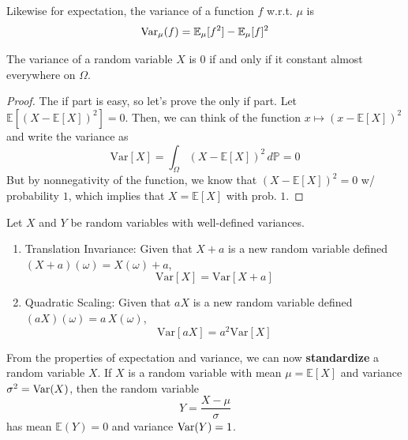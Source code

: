   Likewise for expectation, the variance of a function $f$ w.r.t. $\mu$ is 
  \begin{equation}
    \Var_\mu (f) = \mathbb{E}_\mu [f^2] - \mathbb{E}_\mu [f]^2
  \end{equation}

  \begin{proposition}
    The variance of a random variable $X$ is $0$ if and only if it constant almost everywhere on $\Omega$. 
  \end{proposition}
  \begin{proof}
    The if part is easy, so let's prove the only if part. Let $\mathbb{E} [ (X - \mathbb{E}[X])^2 ] = 0$. Then, we can think of the function $x \mapsto (x - \mathbb{E}[X])^2$ and write the variance as 
    \begin{equation}
      \mathrm{Var}[X] = \int_\Omega (X - \mathbb{E}[X])^2 \, d\mathbb{P} = 0
    \end{equation}
    But by nonnegativity of the function, we know that $(X - \mathbb{E}[X])^2 = 0$ w/ probability $1$, which implies that $X = \mathbb{E}[X]$ with prob. $1$. 
  \end{proof}

  \begin{lemma}
    Let $X$ and $Y$ be random variables with well-defined variances. 
    \begin{enumerate}
      \item Translation Invariance: Given that $X + a$ is a new random variable defined $(X + a)(\omega) = X(\omega) + a$, 
      \begin{equation}
        \mathrm{Var}[X] = \mathrm{Var}[X + a]
      \end{equation}
      \item Quadratic Scaling: Given that $aX$ is a new random variable defined $(aX)(\omega) = a\,X(\omega)$, 
      \begin{equation}
        \mathrm{Var}[aX] = a^2 \mathrm{Var}[X]
      \end{equation}
    \end{enumerate}
  \end{lemma}

  From the properties of expectation and variance, we can now \textbf{standardize} a random variable $X$. If $X$ is a random variable with mean $\mu = \mathbb{E}[X]$ and variance $\sigma^2 = \Var(X)$, then the random variable 
  \begin{equation}
    Y = \frac{X - \mu}{\sigma}
  \end{equation}
  has mean $\mathbb{E}(Y) = 0$ and variance $\Var(Y) = 1$. 

